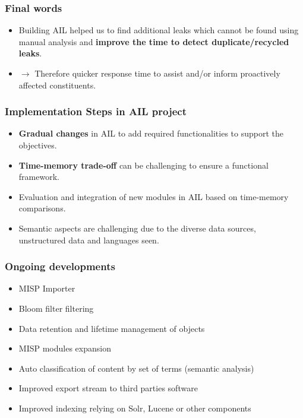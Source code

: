 \documentclass{beamer}
\begin{document}
\begin{frame}
   \frametitle{Final words}
   \begin{itemize}
        \item Building AIL helped us to find additional leaks which cannot be found using manual analysis and {\bf improve the time to detect duplicate/recycled leaks}.
            \vskip0.5cm
        \item[] $\rightarrow$ Therefore quicker response time to assist and/or inform proactively affected constituents.
   \end{itemize}
\end{frame}

\begin{frame}
    \frametitle{Implementation Steps in AIL project}
    \begin{itemize}
            \item {\bf Gradual changes} in AIL to add required functionalities to support the objectives.
            \item {\bf Time-memory trade-off} can be challenging to ensure a functional framework.
            \item Evaluation and integration of new modules in AIL based on time-memory comparisons.
            \item Semantic aspects are challenging due to the diverse data sources, unstructured data and languages seen.
    \end{itemize}
\end{frame}



\begin{frame}
    \frametitle{Ongoing developments}
        \begin{itemize}
        	\item MISP Importer
        	\item Bloom filter filtering
            \item Data retention and lifetime management of objects
            \item MISP modules expansion
            \item Auto classification of content by set of terms (semantic analysis)
            \item Improved export stream to third parties software 
            \item Improved indexing relying on Solr, Lucene or other components
        \end{itemize}
\end{frame}
\end{document}
